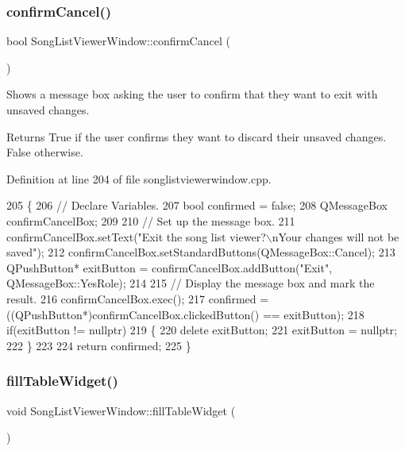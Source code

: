 \subsubsection{\texorpdfstring{confirm\+Cancel()}{confirmCancel()}}
{\footnotesize\ttfamily bool Song\+List\+Viewer\+Window\+::confirm\+Cancel (\begin{DoxyParamCaption}{ }\end{DoxyParamCaption})\hspace{0.3cm}{\ttfamily [private]}}



Shows a message box asking the user to confirm that they want to exit with unsaved changes. 

\begin{DoxyReturn}{Returns}
True if the user confirms they want to discard their unsaved changes. False otherwise. 
\end{DoxyReturn}


Definition at line 204 of file songlistviewerwindow.\+cpp.


\begin{DoxyCode}
205 \{
206     \textcolor{comment}{// Declare Variables.}
207     \textcolor{keywordtype}{bool} confirmed = \textcolor{keyword}{false};
208     QMessageBox confirmCancelBox;
209 
210     \textcolor{comment}{// Set up the message box.}
211     confirmCancelBox.setText(\textcolor{stringliteral}{"Exit the song list viewer?\(\backslash\)nYour changes will not be saved"});
212     confirmCancelBox.setStandardButtons(QMessageBox::Cancel);
213     QPushButton* exitButton = confirmCancelBox.addButton(\textcolor{stringliteral}{"Exit"}, QMessageBox::YesRole);
214 
215     \textcolor{comment}{// Display the message box and mark the result.}
216     confirmCancelBox.exec();
217     confirmed = ((QPushButton*)confirmCancelBox.clickedButton() == exitButton);
218     \textcolor{keywordflow}{if}(exitButton != \textcolor{keyword}{nullptr})
219     \{
220         \textcolor{keyword}{delete} exitButton;
221         exitButton = \textcolor{keyword}{nullptr};
222     \}
223 
224     \textcolor{keywordflow}{return} confirmed;
225 \}
\end{DoxyCode}
\mbox{\label{class_song_list_viewer_window_a5c13d4e89240659b95eb4b70ddc7f37d}} 
\subsubsection{\texorpdfstring{fill\+Table\+Widget()}{fillTableWidget()}}
{\footnotesize\ttfamily void Song\+List\+Viewer\+Window\+::fill\+Table\+Widget (\begin{DoxyParamCaption}{ }\end{DoxyParamCaption})\hspace{0.3cm}{\ttfamily [private]}}




